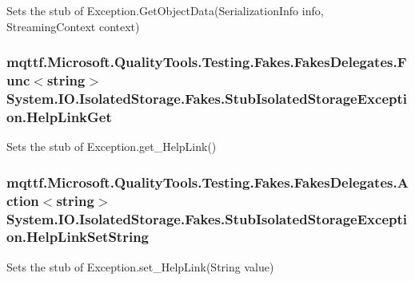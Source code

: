 Sets the stub of Exception.\-Get\-Object\-Data(\-Serialization\-Info info, Streaming\-Context context)

\hypertarget{class_system_1_1_i_o_1_1_isolated_storage_1_1_fakes_1_1_stub_isolated_storage_exception_a6a0efdc94a9ca47a2104c40a22c9c8b5}{
\subsubsection[{Help\-Link\-Get}]{\setlength{\rightskip}{0pt plus 5cm}mqttf.\-Microsoft.\-Quality\-Tools.\-Testing.\-Fakes.\-Fakes\-Delegates.\-Func$<$string$>$ System.\-I\-O.\-Isolated\-Storage.\-Fakes.\-Stub\-Isolated\-Storage\-Exception.\-Help\-Link\-Get}}\label{class_system_1_1_i_o_1_1_isolated_storage_1_1_fakes_1_1_stub_isolated_storage_exception_a6a0efdc94a9ca47a2104c40a22c9c8b5}


Sets the stub of Exception.\-get\-\_\-\-Help\-Link()

\hypertarget{class_system_1_1_i_o_1_1_isolated_storage_1_1_fakes_1_1_stub_isolated_storage_exception_a2b1c160846fdd0ecc509aaff3c9429e4}{
\subsubsection[{Help\-Link\-Set\-String}]{\setlength{\rightskip}{0pt plus 5cm}mqttf.\-Microsoft.\-Quality\-Tools.\-Testing.\-Fakes.\-Fakes\-Delegates.\-Action$<$string$>$ System.\-I\-O.\-Isolated\-Storage.\-Fakes.\-Stub\-Isolated\-Storage\-Exception.\-Help\-Link\-Set\-String}}\label{class_system_1_1_i_o_1_1_isolated_storage_1_1_fakes_1_1_stub_isolated_storage_exception_a2b1c160846fdd0ecc509aaff3c9429e4}


Sets the stub of Exception.\-set\-\_\-\-Help\-Link(\-String value)

